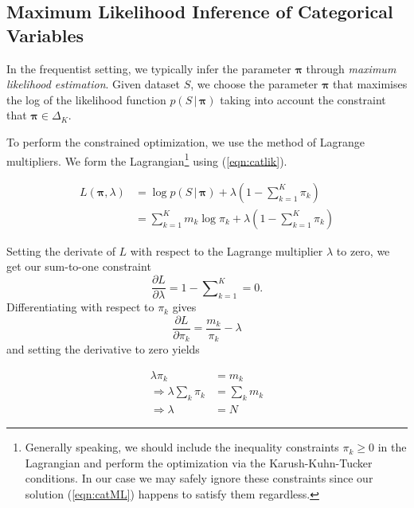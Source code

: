 \documentclass[final,3p,times,twocolumn]{elsarticle}
\let\bs\boldsymbol
\begin{document}
\subsection{Maximum Likelihood Inference of Categorical Variables}
In the frequentist setting, we typically infer the parameter $\bs \pi$ through \emph{maximum likelihood estimation}.
Given dataset $S$, we choose the parameter $\bs \pi$ that maximises the log of the likelihood function $p(S\,|\,\bs \pi)$ taking into account the constraint that $\bs \pi \in \Delta_K$.

To perform the constrained optimization, we use the method of Lagrange multipliers. We form the Lagrangian\footnote{Generally speaking, we should include the inequality constraints $\pi_k \geq 0$ in the Lagrangian and perform the optimization via the Karush-Kuhn-Tucker conditions.
In our case we may safely ignore these constraints since our solution (\ref{eqn:catML}) happens to satisfy them regardless.}
using (\ref{eqn:catlik}).

\begin{equation*}
\begin{split}
L(\bs \pi, \lambda) &= \log p(S\,|\,\bs \pi) + \lambda\left(1 - \sum \nolimits_{k=1}^K \pi_k\right)\\
&= \sum\nolimits_{k=1}^K m_k \log \pi_k + \lambda\left(1-\sum\nolimits_{k=1}^K \pi_k\right)
\end{split}
\end{equation*}

Setting the derivate of $L$ with respect to the Lagrange multiplier $\lambda$ to zero, we get our sum-to-one constraint
\begin{equation*}
\frac{\partial L}{\partial \lambda} = 1 - \sum\nolimits_{k=1}^K = 0.
\end{equation*}
Differentiating with respect to $\pi_k$ gives
\begin{equation*}
\frac{\partial L}{\partial \pi_k} = \frac{m_k}{\pi_k} - \lambda
\end{equation*}
and setting the derivative to zero yields

\begin{equation*}
\begin{split}
\lambda \pi_k &= m_k\\
\Rightarrow \lambda \sum\nolimits_k \pi_k &= \sum\nolimits_k m_k\\
\Rightarrow \lambda &= N
\end{split}
\end{equation*}
\end{document}
